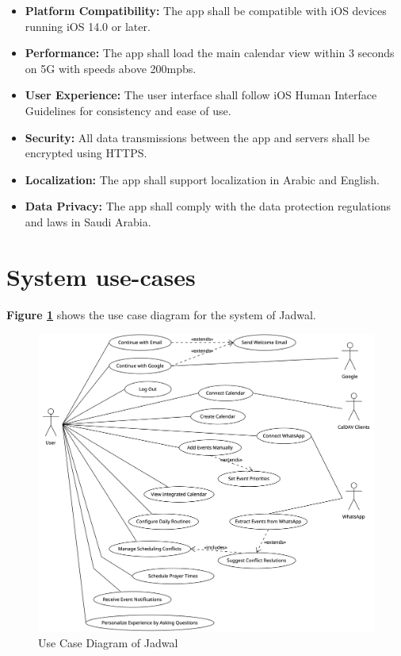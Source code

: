 \documentclass[12pt,a4paper]{report}
\begin{document}
\begin{itemize}
    \item \textbf{Platform Compatibility:} The app shall be compatible with iOS devices running iOS 14.0 or later.
    \item \textbf{Performance:} The app shall load the main calendar view within 3 seconds on 5G with speeds above 200mpbs.
    \item \textbf{User Experience:} The user interface shall follow iOS Human Interface Guidelines for consistency and ease of use.
    \item \textbf{Security:} All data transmissions between the app and servers shall be encrypted using HTTPS.
    \item \textbf{Localization:} The app shall support localization in Arabic and English.
    \item \textbf{Data Privacy:} The app shall comply with the data protection regulations and laws in Saudi Arabia.
\end{itemize}

\section{System use-cases}

\textbf{Figure \ref{fig:use-case-diagram}} shows the use case diagram for the system of Jadwal.

\begin{figure}[!h]
    \centering
    \includegraphics[width=\textwidth]{images/use-case-diagram.png}
    \caption{Use Case Diagram of Jadwal}
    \label{fig:use-case-diagram}
\end{figure}






\end{document}
